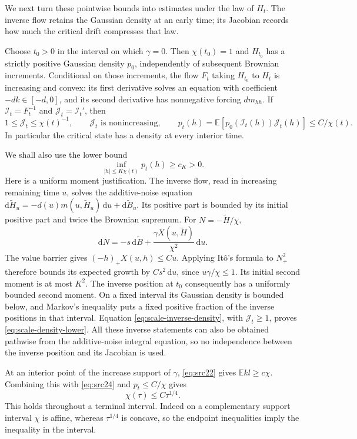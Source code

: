 \documentclass[11pt,a4paper]{article}
\numberwithin{equation}{section}
\theoremstyle{definition}
\theoremstyle{remark}
\newcommand{\E}{\mathbb E}
\newcommand{\dd}{\mathrm d}
\begin{document}
We next turn these pointwise bounds into estimates under the law of
$H_t$. The inverse flow retains the Gaussian density at an early time;
its Jacobian records how much the critical drift compresses that law.

Choose $t_0>0$ in the interval on which $\gamma=0$. Then
$\chi(t_0)=1$ and $H_{t_0}$ has a strictly positive Gaussian density
$p_0$, independently of subsequent Brownian increments. Conditional
on those increments, the flow $F_t$ taking $H_{t_0}$ to $H_t$ is
increasing and convex: its first derivative solves an equation with
coefficient $-dk\in[-d,0]$, and its second derivative has nonnegative
forcing $d m_{hh}$. If $\mathcal I_t=F_t^{-1}$ and $\mathcal J_t=\mathcal I_t'$, then
\begin{equation}\label{eq:scale-inverse-density}
 1\le \mathcal J_t\le\chi(t)^{-1},\qquad \mathcal J_t\text{ is nonincreasing},\qquad
 p_t(h)=\E[p_0(\mathcal I_t(h))\mathcal J_t(h)]\le C/\chi(t).
\end{equation}
In particular the critical state has a density at every interior time.

We shall also use the lower bound
\begin{equation}\label{eq:scale-density-lower}
 \inf_{|h|\le K\chi(t)}p_t(h)\ge c_K>0.
\end{equation}
Here is a uniform moment justification. The inverse flow, read in
increasing remaining time $u$, solves the additive-noise equation
$\dd\widetilde H_u=-d(u)m(u,\widetilde H_u)\,\dd u+\dd\widetilde B_u$.
Its positive part is bounded by its initial positive part and twice the
Brownian supremum. For $N=-\widetilde H/\chi$,
\[
 \dd N=-s\,\dd\widetilde B+\frac{\gamma X(u,\widetilde H)}{\chi^2}\,\dd u.
\]
The value barrier gives $(-h)_+X(u,h)\le Cu$. Applying It\^o's formula
to $N_+^2$ therefore bounds its expected growth by $Cs^2\,\dd u$,
since $u\gamma/\chi\le1$. Its initial second moment is at most $K^2$.
The inverse position at $t_0$ consequently has a uniformly bounded
second moment. On a fixed interval its Gaussian density is bounded
below, and Markov's inequality puts a fixed positive fraction of the
inverse positions in that interval. Equation
\eqref{eq:scale-inverse-density}, with $\mathcal J_t\ge1$, proves
\eqref{eq:scale-density-lower}. All these inverse statements can also
be obtained pathwise from the additive-noise integral equation, so no
independence between the inverse position and its Jacobian is used.

At an interior point of the increase support of $\gamma$,
\eqref{eq:src22} gives $\E kl\ge c\chi$. Combining this with
\eqref{eq:src24} and $p_t\le C/\chi$ gives
\begin{equation}\label{eq:scale-chi-quarter}
 \chi(\tau)\le C\tau^{1/4}.
\end{equation}
This holds throughout a terminal interval. Indeed on a complementary
support interval $\chi$ is affine, whereas $\tau^{1/4}$ is concave,
so the endpoint inequalities imply the inequality in the interval.
\end{document}
